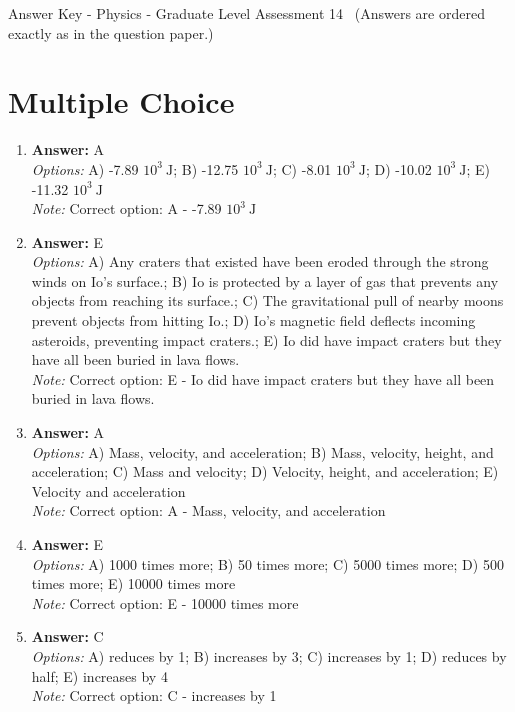 \documentclass[12pt]{article}
\begin{document}
\begin{center}
Answer Key - Physics - Graduate Level Assessment 14 \
\small (Answers are ordered exactly as in the question paper.)
\end{center}

\section*{Multiple Choice}
\begin{enumerate}[label=\arabic*.]
\item \textbf{Answer:} A
\\ \textit{Options:} A) -7.89 $10^3 \mathrm{~J}$; B) -12.75 $10^3 \mathrm{~J}$; C) -8.01 $10^3 \mathrm{~J}$; D) -10.02 $10^3 \mathrm{~J}$; E) -11.32 $10^3 \mathrm{~J}$
\\ \textit{Note:} Correct option: A - -7.89 $10^3 \mathrm{~J}$
\item \textbf{Answer:} E
\\ \textit{Options:} A) Any craters that existed have been eroded through the strong winds on Io's surface.; B) Io is protected by a layer of gas that prevents any objects from reaching its surface.; C) The gravitational pull of nearby moons prevent objects from hitting Io.; D) Io's magnetic field deflects incoming asteroids, preventing impact craters.; E) Io did have impact craters but they have all been buried in lava flows.
\\ \textit{Note:} Correct option: E - Io did have impact craters but they have all been buried in lava flows.
\item \textbf{Answer:} A
\\ \textit{Options:} A) Mass, velocity, and acceleration; B) Mass, velocity, height, and acceleration; C) Mass and velocity; D) Velocity, height, and acceleration; E) Velocity and acceleration
\\ \textit{Note:} Correct option: A - Mass, velocity, and acceleration
\item \textbf{Answer:} E
\\ \textit{Options:} A) 1000 times more; B) 50 times more; C) 5000 times more; D) 500 times more; E) 10000 times more
\\ \textit{Note:} Correct option: E - 10000 times more
\item \textbf{Answer:} C
\\ \textit{Options:} A) reduces by 1; B) increases by 3; C) increases by 1; D) reduces by half; E) increases by 4
\\ \textit{Note:} Correct option: C - increases by 1
\end{enumerate}
\end{document}
